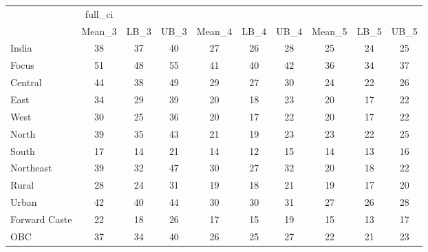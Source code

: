 \begin{tabular}{l*{9}{c}}
\toprule
                    &     full\_ci&            &            &            &            &            &            &            &            \\
                    &      Mean\_3&        LB\_3&        UB\_3&      Mean\_4&        LB\_4&        UB\_4&      Mean\_5&        LB\_5&        UB\_5\\
\midrule
India               &          38&          37&          40&          27&          26&          28&          25&          24&          25\\
Focus               &          51&          48&          55&          41&          40&          42&          36&          34&          37\\
Central             &          44&          38&          49&          29&          27&          30&          24&          22&          26\\
East                &          34&          29&          39&          20&          18&          23&          20&          17&          22\\
West                &          30&          25&          36&          20&          17&          22&          20&          17&          22\\
North               &          39&          35&          43&          21&          19&          23&          23&          22&          25\\
South               &          17&          14&          21&          14&          12&          15&          14&          13&          16\\
Northeast           &          39&          32&          47&          30&          27&          32&          20&          18&          22\\
Rural               &          28&          24&          31&          19&          18&          21&          19&          17&          20\\
Urban               &          42&          40&          44&          30&          30&          31&          27&          26&          28\\
Forward Caste       &          22&          18&          26&          17&          15&          19&          15&          13&          17\\
OBC                 &          37&          34&          40&          26&          25&          27&          22&          21&          23\\

\end{tabular}
